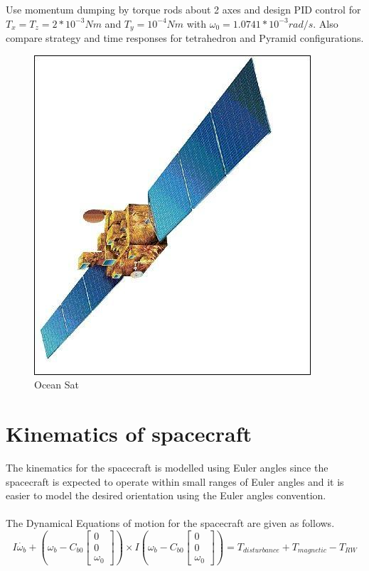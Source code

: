 \documentclass[10pt,a4paper]{report}
\begin{document}
Use momentum dumping by torque rods about 2 axes and design PID control for $ T_{x}= T_{z}=2*10^{-3}Nm $ and $ T_{y}=10^{-4}Nm $ with $ \omega_{0}= 1.0741*10^{-3} rad/s $.
Also compare strategy and time responses for tetrahedron and Pyramid configurations.
\\\begin{figure}[H]
\centering
\includegraphics[scale=0.5]{image_gallery.png}
\caption{Ocean Sat}
\end{figure}
\chapter{Kinematics of spacecraft}
The kinematics for the spacecraft is modelled using Euler angles since the spacecraft is expected to operate within small ranges of Euler angles and it is easier to model the desired orientation using the Euler angles convention.
\\ \\
The Dynamical Equations of motion for the spacecraft are given as follows.\\
\begin{equation}
I\dot{\omega_{b}}+\left(\omega_{b}-C_{b0}\begin{bmatrix}
0\\0\\\omega_{0}
\end{bmatrix}\right)\times I\left(\omega_{b}-C_{b0}\begin{bmatrix}
0\\0\\\omega_{0}
\end{bmatrix}\right)=T_{disturbance}+T_{magnetic}-T_{RW}
\end{equation}
\end{document}
